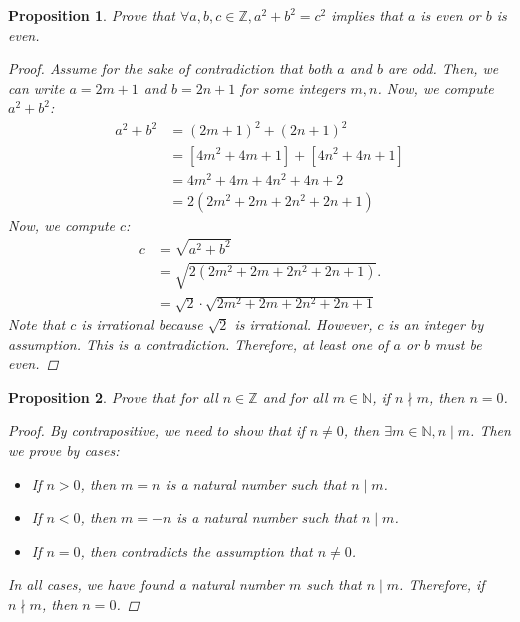 \documentclass[12pt]{article}
\newcommand{\N}{\mathbb{N}} %
\newcommand{\Z}{\mathbb{Z}} %
\newtheorem{proposition}{Proposition}
\begin{document}
\begin{proposition}
  Prove that $\forall a, b, c \in \Z, a^2 + b^2 = c^2$ implies that $a$ is even or $b$ is even.
  \begin{proof}
    Assume for the sake of contradiction that both $a$ and $b$ are odd. Then, we can write $a = 2m + 1$ and $b = 2n + 1$ for some integers $m, n$. Now, we compute $a^2 + b^2$:
    \begin{align*}
      a^2 + b^2
       & = (2m + 1)^2 + (2n + 1)^2           \\
       & = [4m^2 + 4m + 1] + [4n^2 + 4n + 1] \\
       & = 4m^2 + 4m + 4n^2 + 4n + 2         \\
       & = 2(2m^2 + 2m + 2n^2 + 2n + 1)
    \end{align*}
    Now, we compute $c$:
    \begin{align*}
      c & = \sqrt{a^2 + b^2}                                \\
        & = \sqrt{2(2m^2 + 2m + 2n^2 + 2n + 1)}.            \\
        & = \sqrt{2} \cdot \sqrt{2m^2 + 2m + 2n^2 + 2n + 1}
    \end{align*}
    Note that $c$ is irrational because $\sqrt{2}$ is irrational.
    However, $c$ is an integer by assumption. This is a contradiction.
    Therefore, at least one of $a$ or $b$ must be even.
  \end{proof}
\end{proposition}


\begin{proposition}
  Prove that for all $n \in \Z$ and for all $m \in \N$, if $n \nmid m$, then $n = 0$.
  \begin{proof}
    By contrapositive, we need to show that if $n \neq 0$, then $\exists m \in \N, n \mid m$.
    Then we prove by cases:
    \begin{itemize}
      \item If $n > 0$, then $m = n$ is a natural number such that $n \mid m$.
      \item If $n < 0$, then $m = -n$ is a natural number such that $n \mid m$.
      \item If $n = 0$, then contradicts the assumption that $n \neq 0$.
    \end{itemize}
    In all cases, we have found a natural number $m$ such that $n \mid m$.
    Therefore, if $n \nmid m$, then $n = 0$.
  \end{proof}
\end{proposition}
\end{document}
